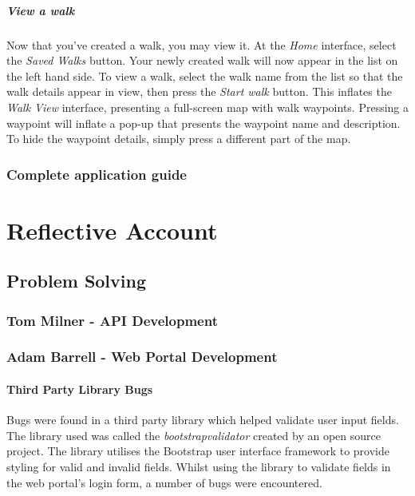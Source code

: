 \documentclass[11pt,a4paper]{report}
\begin{document}
\paragraph*{View a walk}

Now that you've created a walk, you may view it. At the \emph{Home} interface, select the \emph{Saved Walks} button. Your newly created walk will now appear in the list on the left hand side. To view a walk, select the walk name from the list so that the walk details appear in view, then press the \emph{Start walk} button. This inflates the \emph{Walk View} interface, presenting a full-screen map with walk waypoints. Pressing a waypoint will inflate a pop-up that presents the waypoint name and description. To hide the waypoint details, simply press a different part of the map.

\subsection{Complete application guide}

\chapter{Reflective Account}
\label{sec:reflective-account}
\section{Problem Solving}
\label{sec:problem-solving}
\subsection{Tom Milner - API Development}
\subsection{Adam Barrell - Web Portal Development}

\subsubsection{Third Party Library Bugs}
Bugs were found in a third party library which helped validate user input fields. The library used was called the \emph{bootstrapvalidator}\cite{bootstrapvalidator} created by an open source project. The library utilises the Bootstrap user interface framework to provide styling for valid and invalid fields. Whilst using the library to validate fields in the web portal's login form, a number of bugs were encountered.
\end{document}
